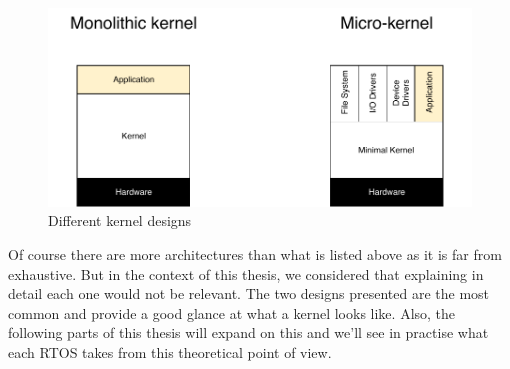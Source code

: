 \begin{figure}[!h]
    \centering
    \includegraphics[scale=0.7]{assets/kernel_types.pdf}
    \caption{\label{fig:kernel-types}Different kernel designs}
\end{figure}

Of course there are more architectures than what is listed above as it is far from exhaustive.
But in the context of this thesis, we considered that explaining in detail each one would not be relevant.
The two designs presented are the most common and provide a good glance at what a kernel looks like.
Also, the following parts of this thesis will expand on this
    and we'll see in practise what each RTOS takes from this theoretical point of view.
